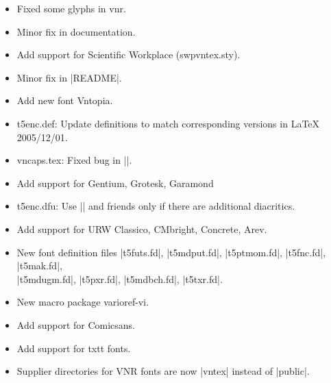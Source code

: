 \documentclass[a4paper,11pt]{article}
\def\pkg#1{{\sffamily#1}}
\begin{document}
\begin{releasenotes}
\begin{itemize}
\item Fixed some glyphs in \pkg{vnr}.
\end{itemize}

\begin{itemize}
  \item Minor fix in documentation.
\end{itemize}

\begin{itemize}
  \item Add support for Scientific Workplace (swpvntex.sty).
\end{itemize}

\begin{itemize}
\item Minor fix in |README|.
\end{itemize}

\begin{itemize}
\item Add new font Vntopia.
\item t5enc.def:  Update definitions to match corresponding versions in
  LaTeX 2005/12/01.
\end{itemize}

\newpage

\begin{itemize}
  \item vncaps.tex: Fixed bug in |\indexname|.
  \item Add support for Gentium, Grotesk, Garamond
  \item t5enc.dfu: Use |\ACIRCUMFLEX| and
    friends only if there are additional diacritics.
  \item Add support for URW Classico, CMbright, Concrete, Arev.
  \item New font definition files |t5futs.fd|, |t5mdput.fd|,
    |t5ptmom.fd|, |t5fnc.fd|, |t5mak.fd|,\\ |t5mdugm.fd|, |t5pxr.fd|,
    |t5mdbch.fd|, |t5txr.fd|.
  \item New macro package \pkg{varioref-vi}.
  \item Add support for Comicsans.
  \item Add support for txtt fonts.
  \item Supplier directories for VNR fonts are now |vntex| instead of
    |public|.
\end{itemize}


\end{releasenotes}
\end{document}
